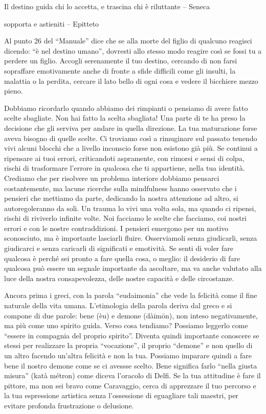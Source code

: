 \documentclass[12pt]{book} %
\begin{document}
Il destino guida chi lo accetta, e trascina chi è riluttante – Seneca

sopporta e astieniti – Epitteto

Al punto 26 del “Manuale” dice che se alla morte del figlio di qualcuno reagisci
dicendo: “è nel destino umano”, dovresti allo stesso modo reagire così se fossi tu a perdere un figlio. Accogli
serenamente il tuo destino, cercando di non farsi sopraffare emotivamente anche di fronte a sfide difficili come gli insulti, la malattia o la perdita, cercare il lato bello di ogni cosa e vedere il bicchiere mezzo pieno.

Dobbiamo ricordarlo quando abbiamo dei rimpianti o pensiamo di avere fatto scelte sbagliate. Non hai fatto la scelta
sbagliata! Una parte di te ha preso la decisione che gli serviva per andare in quella direzione. La tua maturazione forse
aveva bisogno di quelle scelte. Ci troviamo così a rimuginare sul passato tenendo vivi alcuni blocchi che a livello
inconscio forse non esistono già più. Se continui a ripensare ai tuoi errori, criticandoti aspramente, con rimorsi e sensi di
colpa, rischi di trasformare l'errore in qualcosa che ti appartiene, nella tua identità.
Crediamo che per risolvere un problema interiore dobbiamo pensarci costantemente, ma lacune ricerche sulla mindfulness hanno osservato che i pensieri che mettiamo da parte, dedicando la nostra attenzione ad altro, si autoregoleranno da soli.
Un trauma lo vivi una volta sola, ma quando ci ripensi, rischi di riviverlo infinite volte. Noi facciamo le scelte che facciamo, coi
nostri errori e con le nostre contraddizioni. I pensieri emergono per un motivo sconosciuto, ma è importante lasciarli
fluire. Osserviamoli senza giudicarli, senza giudicarci e senza caricarli di significati e emotività. 
Se senti di voler fare qualcosa è perché sei pronto a fare quella cosa, o meglio: il desiderio di fare qualcosa può essere un segnale importante da ascoltare, ma va anche valutato alla luce della nostra consapevolezza, delle nostre capacità e delle circostanze.

Ancora prima i greci, con la parola “eudaimonia” che vede la felicità come il fine naturale della vita umana.
L'etimologia della parola deriva dal greco e si compone di due parole: bene (èu) e demone
(dàimōn), non inteso negativamente, ma più come uno spirito guida. Verso cosa tendiamo? Possiamo leggerlo come “essere
in compagnia del proprio spirito”. Diventa quindi importante conoscere se stessi per realizzare la propria “vocazione”,
il proprio “demone” e non quello di un altro facendo un'altra felicità e non la tua. Possiamo imparare quindi a fare bene il nostro demone come se ci avessse scelto. Bene significa farlo “nella giusta misura” (katà métron) come
diceva l'oracolo di Delfi. Se la tua attitudine è fare il pittore, ma non sei bravo come
Caravaggio, cerca di apprezzare il tuo percorso e la tua espressione artistica senza l'ossessione di eguagliare tali maestri, per evitare profonda frustrazione o delusione.
\end{document}
